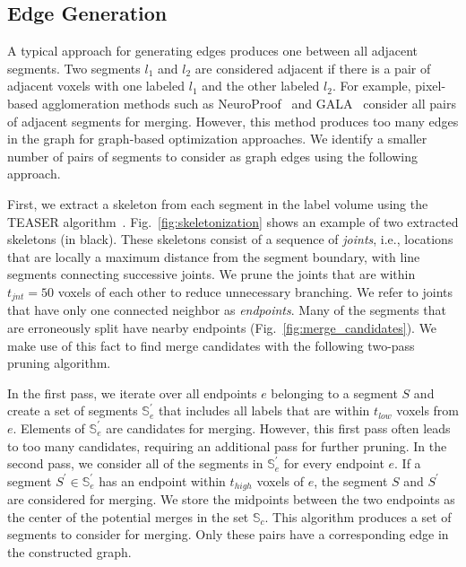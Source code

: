 \subsection{Edge Generation}

A typical approach for generating edges produces one between all adjacent segments. Two segments $l_1$ and $l_2$ are considered adjacent if there is a pair of adjacent voxels with one labeled $l_1$ and the other labeled $l_2$.
For example, pixel-based agglomeration methods such as NeuroProof~\cite{10.1371/journal.pone.0125825} and GALA~\cite{nunez2014graph} consider all pairs of adjacent segments for merging.
However, this method produces too many edges in the graph for graph-based optimization approaches. We identify a smaller number of pairs of segments to consider as graph edges using the following approach.

First, we extract a skeleton from each segment in the label volume using the TEASER algorithm~\cite{sato2000teasar,zhao2014automatic}. Fig.~\ref{fig:skeletonization} shows an example of two extracted skeletons (in black). These skeletons consist of a sequence of \textit{joints}, i.e., locations that are locally a maximum distance from the segment boundary, with line segments connecting successive joints. We prune the joints that are within $t_{jnt} = 50$ voxels of each other to reduce unnecessary branching. We refer to joints that have only one connected neighbor as \textit{endpoints}. Many of the segments that are erroneously split have nearby endpoints  (Fig.~\ref{fig:merge_candidates}). We make use of this fact to find merge candidates with the following two-pass pruning algorithm.

In the first pass, we iterate over all endpoints $e$ belonging to a segment $S$ and create a set of segments $\mathbb{S}_e^\prime$ that includes all labels that are within $t_{low}$ voxels from $e$. Elements of $\mathbb{S}_e^\prime$ are candidates for merging. However, this first pass often leads to too many candidates, requiring an additional pass for further pruning. In the second pass, we consider all of the segments in $\mathbb{S}_e^\prime$ for every endpoint $e$. If a segment $S^\prime \in \mathbb{S}_e^\prime$ has an endpoint within $t_{high}$ voxels of $e$, the segment $S$ and $S^\prime$ are considered for merging. We store the midpoints between the two endpoints as the center of the potential merges in the set $\mathbb{S}_c$. This algorithm produces a set of segments to consider for merging. Only these pairs have a corresponding edge in the constructed graph.



